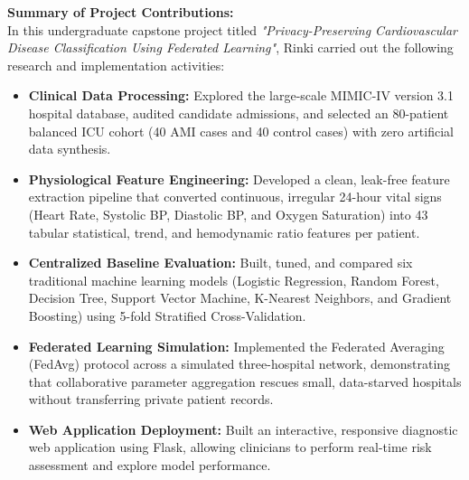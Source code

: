 \documentclass[12pt,a4paper,oneside]{report}
\begin{document}
\noindent \textbf{Summary of Project Contributions:}\\
In this undergraduate capstone project titled \textit{"Privacy-Preserving Cardiovascular Disease Classification Using Federated Learning"}, Rinki carried out the following research and implementation activities:
\begin{itemize}
    \item \textbf{Clinical Data Processing:} Explored the large-scale MIMIC-IV version 3.1 hospital database, audited candidate admissions, and selected an 80-patient balanced ICU cohort (40 AMI cases and 40 control cases) with zero artificial data synthesis.
    \item \textbf{Physiological Feature Engineering:} Developed a clean, leak-free feature extraction pipeline that converted continuous, irregular 24-hour vital signs (Heart Rate, Systolic BP, Diastolic BP, and Oxygen Saturation) into 43 tabular statistical, trend, and hemodynamic ratio features per patient.
    \item \textbf{Centralized Baseline Evaluation:} Built, tuned, and compared six traditional machine learning models (Logistic Regression, Random Forest, Decision Tree, Support Vector Machine, K-Nearest Neighbors, and Gradient Boosting) using 5-fold Stratified Cross-Validation.
    \item \textbf{Federated Learning Simulation:} Implemented the Federated Averaging (FedAvg) protocol across a simulated three-hospital network, demonstrating that collaborative parameter aggregation rescues small, data-starved hospitals without transferring private patient records.
    \item \textbf{Web Application Deployment:} Built an interactive, responsive diagnostic web application using Flask, allowing clinicians to perform real-time risk assessment and explore model performance.
\end{itemize}
\end{document}
